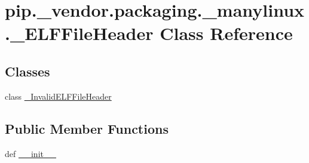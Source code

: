\hypertarget{classpip_1_1__vendor_1_1packaging_1_1__manylinux_1_1__ELFFileHeader}{}\section{pip.\+\_\+vendor.\+packaging.\+\_\+manylinux.\+\_\+\+E\+L\+F\+File\+Header Class Reference}
\label{classpip_1_1__vendor_1_1packaging_1_1__manylinux_1_1__ELFFileHeader}
\subsection*{Classes}
\begin{DoxyCompactItemize}
\item 
class \hyperlink{classpip_1_1__vendor_1_1packaging_1_1__manylinux_1_1__ELFFileHeader_1_1__InvalidELFFileHeader}{\+\_\+\+Invalid\+E\+L\+F\+File\+Header}
\end{DoxyCompactItemize}
\subsection*{Public Member Functions}
\begin{DoxyCompactItemize}
\item 
def \hyperlink{classpip_1_1__vendor_1_1packaging_1_1__manylinux_1_1__ELFFileHeader_a66d6d57d969cf887dc20e6d861d0f24f}{\+\_\+\+\_\+init\+\_\+\+\_\+}
\end{DoxyCompactItemize}
